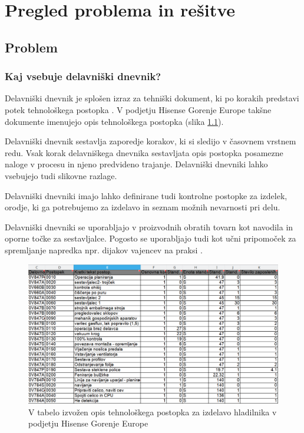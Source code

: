 \documentclass[a4paper, 12pt]{book}
\begin{document}
\chapter{Pregled problema in rešitve}

\section{Problem}

\subsection {Kaj vsebuje delavniški dnevnik?}

Delavniški dnevnik je splošen izraz za tehniški dokument, ki po korakih predstavi potek tehnološkega postopka \cite{delavniskidnevnikptuj}.
V podjetju Hisense Gorenje Europe takšne dokumente imenujejo opis tehnološkega postopka (slika \ref{sap_2}).

Delavniški dnevnik sestavlja zaporedje korakov, ki si sledijo v časovnem vrstnem redu.
Vsak korak delavniškega dnevnika sestavljata opis postopka posamezne naloge v procesu in njeno predvideno trajanje.
Delavniški dnevniki lahko vsebujejo tudi slikovne razlage.

Delavniški dnevniki imajo lahko definirane tudi kontrolne postopke za izdelek, orodje, ki ga potrebujemo za izdelavo in seznam možnih nevarnosti pri delu.

Delavniški dnevniki se uporabljajo v proizvodnih obratih tovarn kot navodila in oporne točke za sestavljalce.
Pogosto se uporabljajo tudi kot učni pripomoček za spremljanje napredka npr. dijakov vajencev na praksi \cite{delavniskidnevnikptuj, ddsclj}.

\begin{figure}[H]
\begin{center}
\includegraphics[width=13.5cm]{sap_2}
\end{center}
\caption{V tabelo izvožen opis tehnološkega postopka za izdelavo hladilnika v podjetju Hisense Gorenje Europe}
\label{sap_2}
\end{figure}
\end{document}
